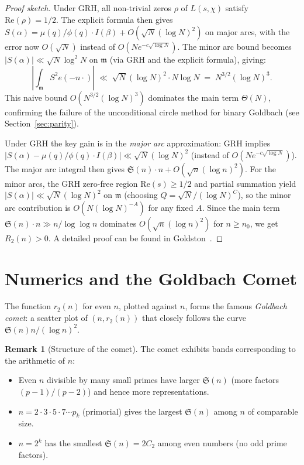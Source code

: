\documentclass[12pt,a4paper]{amsart}
\theoremstyle{definition}
\newtheorem{remark}[theorem]{Remark}
\newcommand{\eq}[1]{e\!\left(#1\right)}
\begin{document}
\begin{proof}[Proof sketch]
  Under GRH, all non-trivial zeros $\rho$ of $L(s,\chi)$ satisfy
  $\text{Re}(\rho) = 1/2$.  The explicit formula then gives
  $S(\alpha) = \mu(q)/\phi(q) \cdot I(\beta) + O(\sqrt{N} (\log N)^2)$
  on major arcs, with the error now $O(\sqrt{N})$ instead of
  $O(N e^{-c\sqrt{\log N}})$.  The minor arc bound becomes
  $|S(\alpha)| \ll \sqrt{N} \log^2 N$ on $\mathfrak{m}$ (via GRH and
  the explicit formula), giving:
  \[
    \left|\int_{\mathfrak{m}} S^2 \eq{-n\cdot}\right|
    \;\ll\; \sqrt{N} (\log N)^2 \cdot N \log N \;=\; N^{3/2} (\log N)^3.
  \]
  This naive bound $O(N^{3/2}(\log N)^3)$ dominates the main term $\Theta(N)$,
  confirming the failure of the unconditional circle method for binary Goldbach
  (see Section~\ref{sec:parity}).

  Under GRH the key gain is in the \emph{major arc} approximation:
  GRH implies $|S(\alpha) - \mu(q)/\phi(q)\cdot I(\beta)| \ll \sqrt{N}(\log N)^2$
  (instead of $O(Ne^{-c\sqrt{\log N}})$).  The major arc integral then gives
  $\mathfrak{S}(n)\cdot n + O(\sqrt{n}(\log n)^2)$.
  For the minor arcs, the GRH zero-free region $\mathrm{Re}(s)\geq 1/2$ and
  partial summation yield $|S(\alpha)| \ll \sqrt{N}(\log N)^2$ on $\mathfrak{m}$
  (choosing $Q = \sqrt{N}/(\log N)^C$), so the minor arc contribution is
  $O(N(\log N)^{-A})$ for any fixed $A$.  Since the main term $\mathfrak{S}(n)\cdot n
  \gg n/\log\log n$ dominates $O(\sqrt{n}(\log n)^2)$ for $n \geq n_0$, we get
  $R_2(n) > 0$.  A detailed proof can be found in Goldston~\cite{Goldston1992}.
\end{proof}

\section{Numerics and the Goldbach Comet}
\label{sec:goldbach_comet}

The function $r_2(n)$ for even $n$, plotted against $n$, forms the
famous \emph{Goldbach comet}: a scatter plot of $(n, r_2(n))$ that
closely follows the curve $\mathfrak{S}(n) n / (\log n)^2$.

\begin{remark}[Structure of the comet]
  The comet exhibits bands corresponding to the arithmetic of $n$:
  \begin{itemize}
    \item Even $n$ divisible by many small primes have larger $\mathfrak{S}(n)$
      (more factors $(p-1)/(p-2)$) and hence more representations.
    \item $n = 2 \cdot 3 \cdot 5 \cdot 7 \cdots p_k$ (primorial) gives the
      largest $\mathfrak{S}(n)$ among $n$ of comparable size.
    \item $n = 2^k$ has the smallest $\mathfrak{S}(n) = 2C_2$ among even
      numbers (no odd prime factors).
  \end{itemize}
\end{remark}
\end{document}
